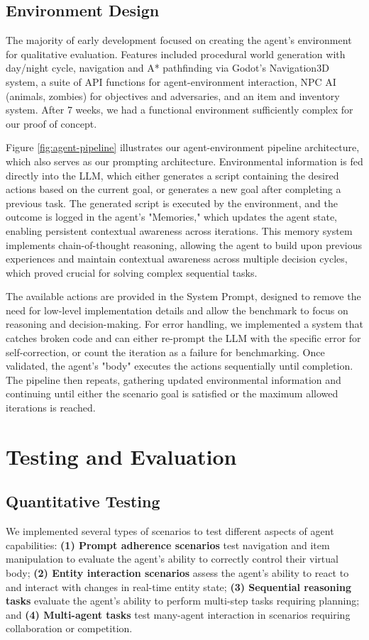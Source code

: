 \documentclass{article}
\begin{document}
\subsection{Environment Design}
The majority of early development focused on creating the agent's environment for qualitative evaluation.
Features included procedural world generation with day/night cycle, navigation and A* pathfinding via Godot's Navigation3D system, a suite of API functions for agent-environment interaction, NPC AI (animals, zombies) for objectives and adversaries, and an item and inventory system.
After 7 weeks, we had a functional environment sufficiently complex for our proof of concept.

Figure \ref{fig:agent-pipeline} illustrates our agent-environment pipeline architecture, which also serves as our prompting architecture.
Environmental information is fed directly into the LLM, which either generates a script containing the desired actions based on the current goal, or generates a new goal after completing a previous task.
The generated script is executed by the environment, and the outcome is logged in the agent's "Memories," which updates the agent state, enabling persistent contextual awareness across iterations. This memory system implements chain-of-thought reasoning, allowing the agent to build upon previous experiences and maintain contextual awareness across multiple decision cycles, which proved crucial for solving complex sequential tasks.

The available actions are provided in the System Prompt, designed to remove the need for low-level implementation details and allow the benchmark to focus on reasoning and decision-making.
For error handling, we implemented a system that catches broken code and can either re-prompt the LLM with the specific error for self-correction, or count the iteration as a failure for benchmarking.
Once validated, the agent's "body" executes the actions sequentially until completion. 
The pipeline then repeats, gathering updated environmental information and continuing until either the scenario goal is satisfied or the maximum allowed iterations is reached.

\section{Testing and Evaluation}
\subsection{Quantitative Testing}
We implemented several types of scenarios to test different aspects of agent capabilities:
\textbf{(1) Prompt adherence scenarios} test navigation and item manipulation to evaluate the agent's ability to correctly control their virtual body;
\textbf{(2) Entity interaction scenarios} assess the agent's ability to react to and interact with changes in real-time entity state;
\textbf{(3) Sequential reasoning tasks} evaluate the agent's ability to perform multi-step tasks requiring planning; and
\textbf{(4) Multi-agent tasks} test many-agent interaction in scenarios requiring collaboration or competition.
\end{document}
